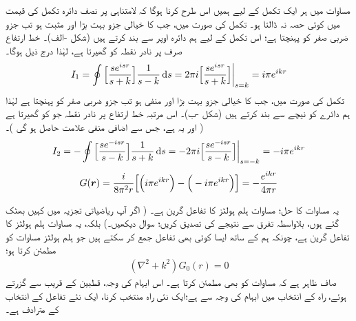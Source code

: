 مساوات  میں ہر ایک تکمل کے لیے ہمیں اس طرح  کرنا ہوگا کہ لامتناہی پر نصف دائرہ تکمل کی قیمت میں کوئی حصہ نہ ڈالتا ہو۔ تکمل  کی صورت میں، جب  کا خیالی جزو بہت بڑا اور مثبت ہو تب جزو ضربی  صفر کو پہنچتا ہے؛ اس تکمل کے لیے ہم دائرہ اوپر سے بند کرتے ہیں (شکل -الف)۔ خط ارتفاع صرف  پر نادر نقطہ کو گھیرتا ہے، لہٰذا درج ذیل ہوگا۔
\begin{align}\label{مساوات_بکھراو_آئی_الف}
	I_1 = \oint\Big[\frac{se^{isr}}{s+k}\Big]\frac{1}{s-k}\dif s = 2\pi i\Big[\frac{se^{isr}}{s+k}\Big]\bigg|_{s=k} = i\pi e^{ikr}
\end{align}
تکمل  کی صورت میں، جب  کا خیالی جزو بہت بڑا اور منفی ہو تب جزو ضربی  صفر کو پہنچتا ہے لہٰذا ہم دائرے کو نیچے سے بند کرتے ہیں (شکل -ب)۔ اس مرتبہ خط ارتفاع  پر نادر نقطہ جو کو گھیرتا ہے ( اور یہ  ہے، جس سے اضافی منفی علامت حاصل ہو گی )۔
\begin{align}\label{مساوات_بکھراو_آئی_ب}
	I_2 = -\oint\Big[\frac{se^{-isr}}{s-k}\Big]\frac{1}{s+k}\dif s = -2\pi i\Big[\frac{se^{-isr}}{s-k}\Big]\bigg|_{s=-k} = -i\pi e^{ikr}
\end{align}
\begin{align}\label{مساوات_بکھراو_مشکل_نتیجہ}
	G({{\boldsymbol{r}}}) = \frac{i}{8\pi^2r}\Big[\Big(i\pi e^{ikr}\Big)-\Big(-i\pi e^{ikr}\Big)\Big] = -\frac{e^{ikr}}{4\pi r}
\end{align}

یہ مساوات  کا حل؛ مساوات ہلم ہولٹز کا تفاعل گرین ہے۔ ( اگر آپ ریاضیاتی تجزیہ میں کہیں بھٹک گئے ہوں، بلاواسطہ تفرق سے نتیجے کی تصدیق کریں؛ 
 سوال  دیکھیں۔) بلکہ، یہ مساوات ہلم ہولٹز کا تفاعل گرین ہے، چونکہ ہم  کے ساتھ ایسا کوئی بھی تفاعل  جمع کر سکتے ہیں جو  ہلم ہولٹز مساوات کو مطمئن کرتا ہو؛
\begin{align}
	(\nabla^2+k^2)G_0(r) = 0
\end{align}
 صاف ظاہر ہے کہ مساوات  کو  بھی مطمئن کرتا ہے۔ اس ابہام کی وجہ، قطبین کے قریب سے گزرتے ہوئے، راہ کے انتخاب میں ابہام کی وجہ سے ہے؛ایک نئی راہ منتخب کرنا، ایک نئے تفاعل  کے انتخاب کے مترادف ہے۔


